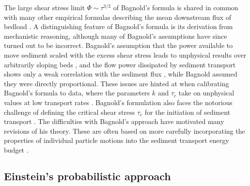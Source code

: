The large shear stress limit $\Phi \sim \tau^{3/2}$ of Bagnold's formula is shared in common with many other empirical formulas describing the mean downstream flux of bedload \citep[e.g.][]{MeyerPeter1948, Yalin1972, Wilcock2003, Parker1990}. A distinguishing feature of Bagnold's formula is its derivation from mechanistic reasoning, although many of Bagnold's assumptions have since turned out to be incorrect.
Bagnold's assumption that the power available to move sediment scaled with the excess shear stress leads to unphysical results over arbitrarily sloping beds \citep{Seminara2002}, and the flow power dissipated by sediment transport shows only a weak correlation with the sediment flux \citep{Ancey2008}, while Bagnold assumed they were directly proportional. These issues are hinted at when calibrating Bagnold's formula to data, where the parameters $k$ and $\tau_c$ take on unphysical values at low transport rates \citep{Nino1996}.
Bagnold's formulation also faces the notorious challenge of defining the critical shear stress $\tau_c$ for the initiation of sediment transport \citep{Paintal1971,Kirchener1990,Houssais2015,Clark2017,Allen2018,Pahtz2020}.
The difficulties with Bagnold's approach have motivated many revisions of his theory.
These are often based on more carefully incorporating the properties of individual particle motions into the sediment transport energy budget \citep{Engelund1976,Luque1976,Nino1998,Martin2000}.

\subsection{Einstein's probabilistic approach}
\label{sec:einflux}


